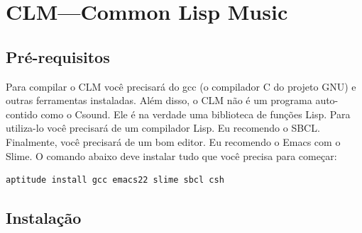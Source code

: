 \documentclass[12pt,brazil]{book}
\begin{document}



\chapter{CLM---Common Lisp Music}
\label{cha:clm-common-lisp}

\section{Pré-requisitos}
\label{sec:pre-requisitos}

Para compilar o CLM você precisará do gcc (o compilador C do projeto
GNU) e outras ferramentas instaladas. Além disso, o CLM não é um
programa auto-contido como o Csound. Ele é na verdade uma biblioteca
de funções Lisp. Para utiliza-lo você precisará de um compilador Lisp.
Eu recomendo o SBCL. Finalmente, você precisará de um bom editor. Eu
recomendo o Emacs com o Slime. O comando abaixo deve instalar tudo que
você precisa para começar:

\begin{verbatim}
aptitude install gcc emacs22 slime sbcl csh
\end{verbatim}

\section{Instalação}
\label{sec:instalacao}
\end{document}
